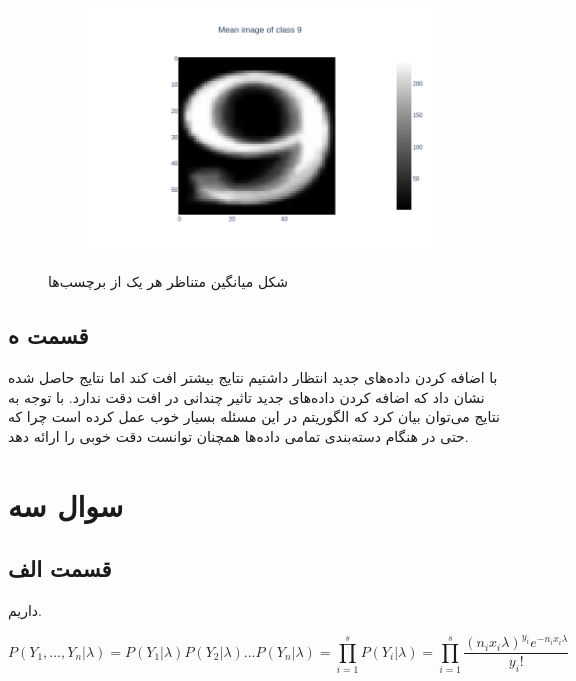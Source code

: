 \documentclass{article}
\begin{document}
\begin{figure}[h]
\begin{subfigure}{.3\linewidth}
        \includegraphics[width=\linewidth]{images/q2/partd/9_prototype.png}
    \end{subfigure}
    \hfill
    \caption{شکل میانگین متناظر هر یک از برچسب‌ها}
    \label{q2-partd}
\end{figure}

\newpage

\subsection*{قسمت ه}

با اضافه کردن داده‌های جدید انتظار داشتیم نتایج بیشتر افت کند اما نتایج حاصل شده نشان داد
که اضافه کردن داده‌های جدید تاثیر چندانی در افت دقت ندارد. با توجه به نتایج می‌توان بیان کرد که
الگوریتم  در این مسئله بسیار خوب عمل کرده است چرا که حتی در هنگام دسته‌بندی تمامی داده‌ها
همچنان توانست دقت خوبی را ارائه دهد.

\newpage

\section*{سوال سه}

\subsection*{قسمت الف}

داریم.

$$P(Y_1, ..., Y_n|\lambda) = P(Y_1|\lambda)P(Y_2|\lambda)...P(Y_n|\lambda) = \prod_{i=1}^{s} P(Y_i|\lambda) = \prod_{i=1}^{s} \frac{(n_ix_i\lambda)^{y_i}e^{-n_ix_i\lambda}}{y_i!}$$
\end{document}
